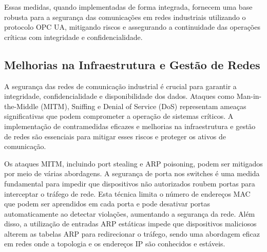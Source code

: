 Essas medidas, quando implementadas de forma integrada, fornecem uma base robusta para a segurança das comunicações em redes industriais utilizando o protocolo OPC UA, mitigando riscos e assegurando a continuidade das operações críticas com integridade e confidencialidade.

\subsection{Melhorias na Infraestrutura e Gestão de Redes}




A segurança das redes de comunicação industrial é crucial para garantir a integridade, confidencialidade e disponibilidade dos dados. Ataques como Man-in-the-Middle (MITM), Sniffing e Denial of Service (DoS) representam ameaças significativas que podem comprometer a operação de sistemas críticos. A implementação de contramedidas eficazes e melhorias na infraestrutura e gestão de redes são essenciais para mitigar esses riscos e proteger os ativos de comunicação.

Os ataques MITM, incluindo port stealing e ARP poisoning, podem ser mitigados por meio de várias abordagens. A segurança de porta nos switches é uma medida fundamental para impedir que dispositivos não autorizados roubem portas para interceptar o tráfego de rede. Esta técnica limita o número de endereços MAC que podem ser aprendidos em cada porta e pode desativar portas automaticamente ao detectar violações, aumentando a segurança da rede. Além disso, a utilização de entradas ARP estáticas impede que dispositivos maliciosos alterem as tabelas ARP para redirecionar o tráfego, sendo uma abordagem eficaz em redes onde a topologia e os endereços IP são conhecidos e estáveis.

